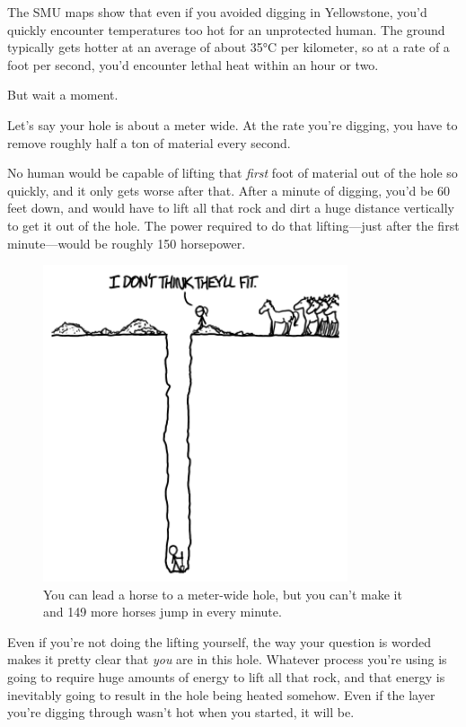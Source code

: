 {{The SMU maps show that even if you avoided digging in Yellowstone, you'd quickly encounter temperatures too hot for an unprotected human. The ground typically gets hotter at an average of about 35°C per kilometer, so at a rate of a foot per second, you'd encounter lethal heat within an hour or two.}

{But wait a moment.}

{Let's say your hole is about a meter wide. At the rate you're digging, you have to remove roughly half a ton of material every second.}

{No human would be capable of lifting that \emph{first} foot of material out of the hole so quickly, and it only gets worse after that. After a minute of digging, you'd be 60 feet down, and would have to lift all that rock and dirt a huge distance vertically to get it out of the hole. The power required to do that lifting—just after the first minute—would be roughly 150 horsepower.}

\begin{figure}[!htbp]
\centering
\includegraphics[scale=0.5, max width=0.8\textwidth]{imgs/a/135/horse.png}
\caption{You can lead a horse to a meter-wide hole, but you can't make it and 149 more horses jump in every minute.}
\end{figure}

{Even if you're not doing the lifting yourself, the way your question is worded makes it pretty clear that \emph{you} are in this hole. Whatever process you're using is going to require huge amounts of energy to lift all that rock, and that energy is inevitably going to result in the hole being heated somehow. Even if the layer you're digging through wasn't hot when you started, it will be.}

}
